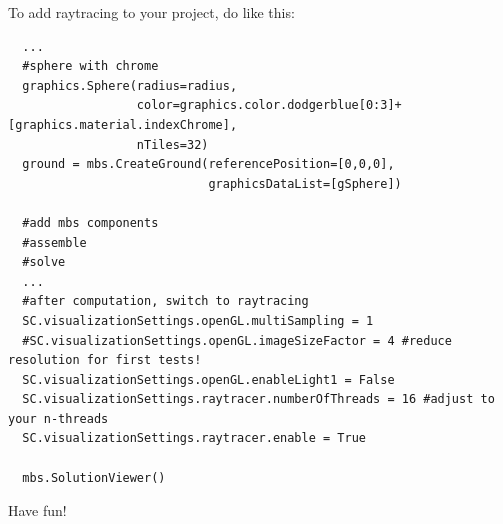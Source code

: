\noindent To add raytracing to your project, do like this:
\pythonstyle\begin{lstlisting}
  ...
  #sphere with chrome
  graphics.Sphere(radius=radius, 
                  color=graphics.color.dodgerblue[0:3]+[graphics.material.indexChrome], 
                  nTiles=32)
  ground = mbs.CreateGround(referencePosition=[0,0,0],
                            graphicsDataList=[gSphere])

  #add mbs components
  #assemble
  #solve
  ...
  #after computation, switch to raytracing
  SC.visualizationSettings.openGL.multiSampling = 1
  #SC.visualizationSettings.openGL.imageSizeFactor = 4 #reduce resolution for first tests!
  SC.visualizationSettings.openGL.enableLight1 = False
  SC.visualizationSettings.raytracer.numberOfThreads = 16 #adjust to your n-threads
  SC.visualizationSettings.raytracer.enable = True
  
  mbs.SolutionViewer()
\end{lstlisting}

\noindent Have fun!



